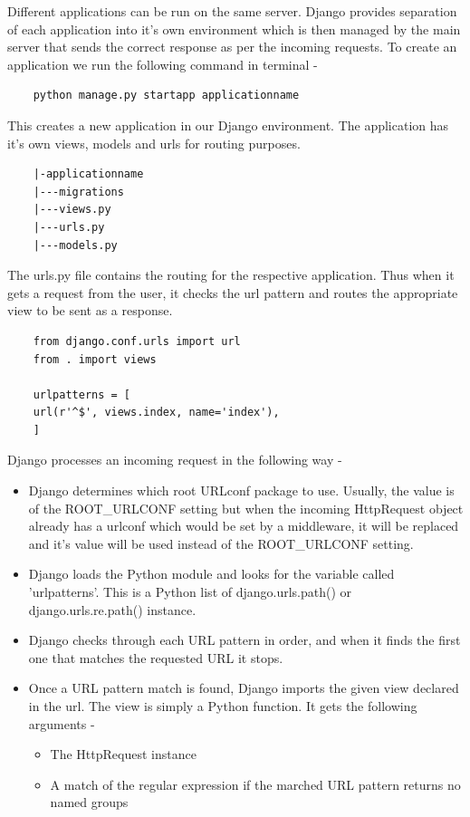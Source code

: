 \documentclass[../thesis.tex]{subfiles}
\begin{document}
	Different applications can be run on the same server. Django provides separation of each application into it's own environment which is then managed by the main server that sends the correct response as per the incoming requests. To create an application we run the following command in terminal - 
	\begin{verbatim}
	python manage.py startapp applicationname
	\end{verbatim}
	This creates a new application in our Django environment. The application has it's own views, models and urls for routing purposes.
	\begin{verbatim}
	|-applicationname
	|---migrations
	|---views.py
	|---urls.py
	|---models.py
	\end{verbatim}
	The urls.py file contains the routing for the respective application. Thus when it gets a request from the user, it checks the url pattern and routes the appropriate view to be sent as a response.
	\begin{verbatim}
	from django.conf.urls import url
	from . import views
	
	urlpatterns = [
	url(r'^$', views.index, name='index'),
	]
	\end{verbatim}
	Django processes an incoming request in the following way - 
	\begin{itemize}
		\item Django determines which root URLconf package to use. Usually, the value is of the ROOT\_URLCONF setting but when the incoming HttpRequest object already has a urlconf which would be set by a middleware, it will be replaced and it's value will be used instead of the ROOT\_URLCONF setting.
		\smallskip
		\item Django loads the Python module and looks for the variable called 'urlpatterns'. This is a Python list of django.urls.path() or django.urls.re.path() instance.
		\smallskip
		\item Django checks through each URL pattern in order, and when it finds the first one that matches the requested URL it stops.
		\smallskip
		\item Once a URL pattern match is found, Django imports the given view declared in the url. The view is simply a Python function. It gets the following arguments - 
		\begin{itemize}
			\item The HttpRequest instance
			\smallskip 
			\item A match of the regular expression if the marched URL pattern returns no named groups
		\end{itemize}
	\end{itemize}
\end{document}
